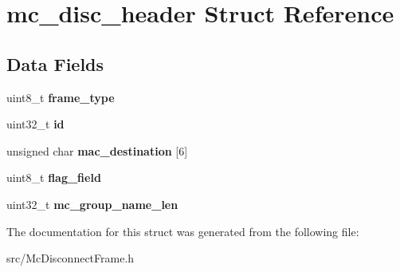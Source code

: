 \hypertarget{structmc__disc__header}{\section{mc\-\_\-disc\-\_\-header Struct Reference}
\label{structmc__disc__header}
}
\subsection*{Data Fields}
\begin{DoxyCompactItemize}
\item 
\hypertarget{structmc__disc__header_a0ef358469b62abe2b0224778d692c4a6}{uint8\-\_\-t {\bfseries frame\-\_\-type}}\label{structmc__disc__header_a0ef358469b62abe2b0224778d692c4a6}

\item 
\hypertarget{structmc__disc__header_aebcd55126136a48ea1ad329d1beccc17}{uint32\-\_\-t {\bfseries id}}\label{structmc__disc__header_aebcd55126136a48ea1ad329d1beccc17}

\item 
\hypertarget{structmc__disc__header_a94072ef4f1664f0c6c0dbdc99f6288a4}{unsigned char {\bfseries mac\-\_\-destination} \mbox{[}6\mbox{]}}\label{structmc__disc__header_a94072ef4f1664f0c6c0dbdc99f6288a4}

\item 
\hypertarget{structmc__disc__header_aa9865df12462c89eeb866d8e7642ffbe}{uint8\-\_\-t {\bfseries flag\-\_\-field}}\label{structmc__disc__header_aa9865df12462c89eeb866d8e7642ffbe}

\item 
\hypertarget{structmc__disc__header_aa4edc269c25a3a0fa2a8b0d53fbe5db6}{uint32\-\_\-t {\bfseries mc\-\_\-group\-\_\-name\-\_\-len}}\label{structmc__disc__header_aa4edc269c25a3a0fa2a8b0d53fbe5db6}

\end{DoxyCompactItemize}


The documentation for this struct was generated from the following file\-:\begin{DoxyCompactItemize}
\item 
src/Mc\-Disconnect\-Frame.\-h\end{DoxyCompactItemize}
